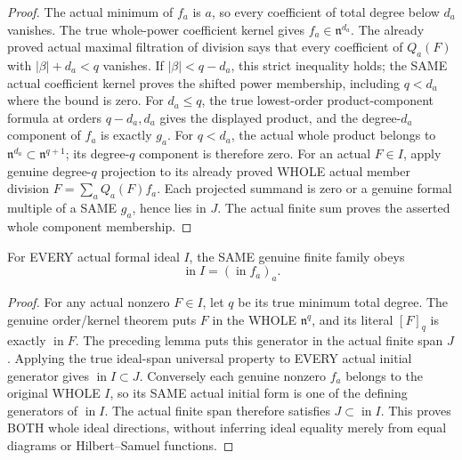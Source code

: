\begin{proof}
The actual minimum of $f_a$ is $a$, so every coefficient of total
degree below $d_a$ vanishes. The true whole-power coefficient kernel
gives $f_a\in\mathfrak n^{d_a}$. The already proved actual maximal
filtration of division says that every coefficient of $Q_a(F)$ with
$|\beta|+d_a<q$ vanishes. If $|\beta|<q-d_a$, this strict inequality
holds; the SAME actual coefficient kernel proves the shifted power
membership, including $q<d_a$ where the bound is zero.
For $d_a\le q$, the true lowest-order product-component formula at
orders $q-d_a,d_a$ gives the displayed product, and the degree-$d_a$
component of $f_a$ is exactly $g_a$. For $q<d_a$, the actual whole
product belongs to $\mathfrak n^{d_a}\subset\mathfrak n^{q+1}$;
its degree-$q$ component is therefore zero. For an actual $F\in I$,
apply genuine degree-$q$ projection to its already proved WHOLE actual
member division $F=\sum_a Q_a(F)f_a$. Each projected summand is zero
or a genuine formal multiple of a SAME $g_a$, hence lies in $J$.
The actual finite sum proves the asserted whole component membership.
\end{proof}

\begin{theorem}
\label{hir:actual-finite-initial-vertex-whole-generation}
For EVERY actual formal ideal $I$, the SAME genuine finite family obeys
\[
 \operatorname{in}I=(\operatorname{in}f_a)_a.
\]
\leanok
\end{theorem}
\begin{proof}
For any actual nonzero $F\in I$, let $q$ be its true minimum total
degree. The genuine order/kernel theorem puts $F$ in the WHOLE
$\mathfrak n^q$, and its literal $[F]_q$ is exactly
$\operatorname{in}F$. The preceding lemma puts this generator in
the actual finite span $J$. Applying the true ideal-span universal
property to EVERY actual initial generator gives
$\operatorname{in}I\subset J$. Conversely each genuine nonzero
$f_a$ belongs to the original WHOLE $I$, so its SAME actual initial
form is one of the defining generators of $\operatorname{in}I$.
The actual finite span therefore satisfies $J\subset\operatorname{in}I$.
This proves BOTH whole ideal directions, without inferring ideal
equality merely from equal diagrams or Hilbert--Samuel functions.
\end{proof}

